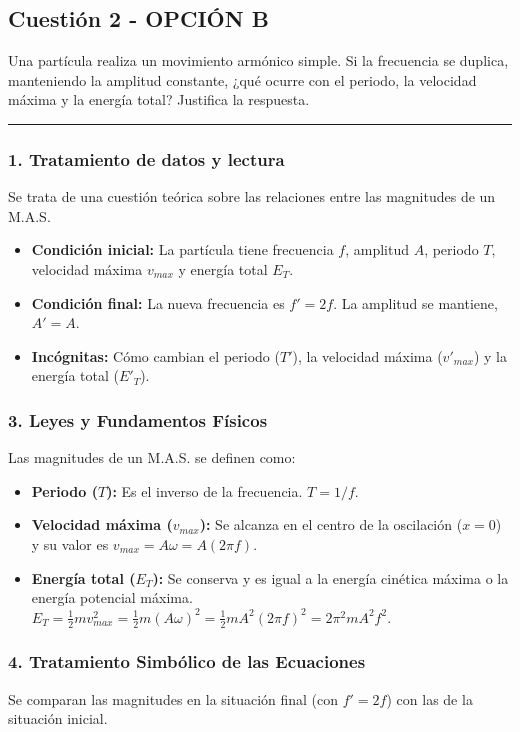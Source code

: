 \newpage

\subsection{Cuestión 2 - OPCIÓN B}
\label{subsec:2B_2010_jun_ord}
\begin{cajaenunciado}
Una partícula realiza un movimiento armónico simple. Si la frecuencia se duplica, manteniendo la amplitud constante, ¿qué ocurre con el periodo, la velocidad máxima y la energía total? Justifica la respuesta.
\end{cajaenunciado}
\hrule

\subsubsection*{1. Tratamiento de datos y lectura}
Se trata de una cuestión teórica sobre las relaciones entre las magnitudes de un M.A.S.
\begin{itemize}
    \item \textbf{Condición inicial:} La partícula tiene frecuencia $f$, amplitud $A$, periodo $T$, velocidad máxima $v_{max}$ y energía total $E_T$.
    \item \textbf{Condición final:} La nueva frecuencia es $f' = 2f$. La amplitud se mantiene, $A' = A$.
    \item \textbf{Incógnitas:} Cómo cambian el periodo ($T'$), la velocidad máxima ($v'_{max}$) y la energía total ($E'_T$).
\end{itemize}

\subsubsection*{3. Leyes y Fundamentos Físicos}
Las magnitudes de un M.A.S. se definen como:
\begin{itemize}
    \item \textbf{Periodo ($T$):} Es el inverso de la frecuencia. $T = 1/f$.
    \item \textbf{Velocidad máxima ($v_{max}$):} Se alcanza en el centro de la oscilación ($x=0$) y su valor es $v_{max} = A\omega = A(2\pi f)$.
    \item \textbf{Energía total ($E_T$):} Se conserva y es igual a la energía cinética máxima o la energía potencial máxima. $E_T = \frac{1}{2}mv_{max}^2 = \frac{1}{2}m(A\omega)^2 = \frac{1}{2}m A^2 (2\pi f)^2 = 2\pi^2 m A^2 f^2$.
\end{itemize}

\subsubsection*{4. Tratamiento Simbólico de las Ecuaciones}
Se comparan las magnitudes en la situación final (con $f' = 2f$) con las de la situación inicial.
